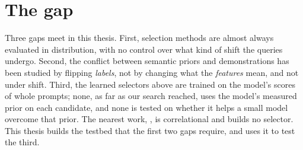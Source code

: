 \section{The gap}
\label{sec:bg-gap}

Three gaps meet in this thesis.
First, selection methods are almost always evaluated in distribution, with no control over what kind of shift the queries undergo.
Second, the conflict between semantic priors and demonstrations has been studied by flipping \emph{labels}, not by changing what the \emph{features} mean, and not under shift.
Third, the learned selectors above are trained on the model's scores of whole prompts; none, as far as our search reached, uses the model's measured prior on each candidate, and none is tested on whether it helps a small model overcome that prior.
The nearest work, \citet{kato2025affinity}, is correlational and builds no selector.
This thesis builds the testbed that the first two gaps require, and uses it to test the third.
